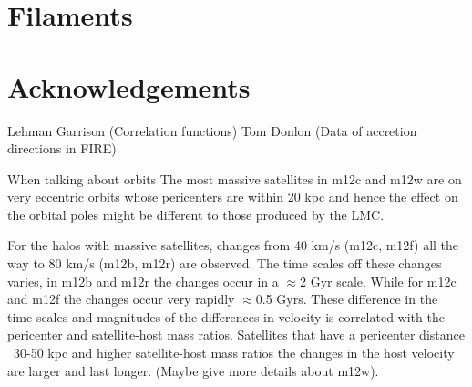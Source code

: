 \documentclass{aastex63}
\begin{document}
\section{Filaments}











\section{Acknowledgements}


Lehman Garrison (Correlation functions)
Tom Donlon (Data of accretion directions in FIRE)

 


\appendix

When talking about orbits 
The most massive satellites in m12c and m12w are on very eccentric orbits whose pericenters are within 20 kpc and hence the effect on the orbital poles might be different to those produced by the LMC. 


For the halos with massive satellites, changes from 40 km/s (m12c, m12f) all the way to 80 km/s (m12b, m12r) are observed. The time scales off these changes varies, in m12b and m12r the changes occur in a $\approx$2 Gyr scale. While for m12c and m12f the changes occur very rapidly $\approx$0.5 Gyrs. These difference in the time-scales and magnitudes of the differences in velocity is correlated with the pericenter and satellite-host mass ratios. Satellites that have a pericenter distance ~30-50 kpc and higher satellite-host mass ratios the changes in the host velocity are larger and last longer. (Maybe give more details about m12w). 
\end{document}
